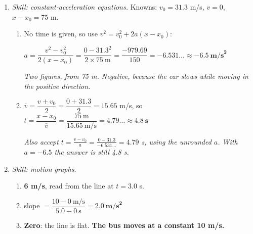 \documentclass[12pt, twoside]{article}
\begin{document}
\begin{enumerate}[itemsep=0.5cm]
\begin{enumerate}[itemsep=0.3cm]
      \emph{Credit $\bar{v}$ only with its sign or direction.}
  \end{enumerate}

\item \emph{Skill: constant-acceleration equations.} Knowns: $v_0 = 31.3$ m/s,
  $v = 0$, $x - x_0 = 75$ m.
  \begin{enumerate}[itemsep=0.3cm]
    \item No time is given, so use $v^2 = v_0^2 + 2a(x - x_0)$:

      $a = \dfrac{v^2 - v_0^2}{2(x - x_0)} = \dfrac{0 - 31.3^2}{2 \times 75~\text{m}}
      = \dfrac{-979.69}{150} = -6.531\ldots \approx
      \mathbf{-6.5~\textbf{m/s}^\mathbf{2}}$

      \emph{Two figures, from 75 m. Negative, because the car slows while moving in
      the positive direction.}
    \item $\bar{v} = \dfrac{v + v_0}{2} = \dfrac{0 + 31.3}{2} = 15.65$ m/s, so
      $t = \dfrac{x - x_0}{\bar{v}} = \dfrac{75~\text{m}}{15.65~\text{m/s}} =
      4.79\ldots \approx \mathbf{4.8~\textbf{s}}$

      \emph{Also accept $t = \frac{v - v_0}{a} = \frac{0 - 31.3}{-6.531\ldots} =
      4.79$ s, using the unrounded $a$. With $a = -6.5$ the answer is still 4.8 s.}
  \end{enumerate}

\newpage

\item \emph{Skill: motion graphs.}

  \begin{center}
  \end{center}

  \begin{enumerate}[itemsep=0.3cm]
    \item \textbf{6 m/s}, read from the line at $t = 3.0$ s.
    \item slope $= \dfrac{10 - 0~\text{m/s}}{5.0 - 0~\text{s}} =
      \mathbf{2.0~\textbf{m/s}^\mathbf{2}}$
    \item \textbf{Zero}: the line is flat. \textbf{The bus moves at a constant
      10 m/s.}


\end{enumerate}
\end{enumerate}
\end{document}
